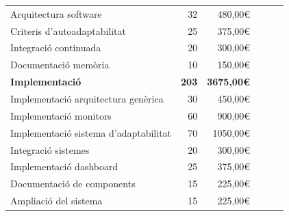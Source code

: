 \begin{table}[htb]
{\begin{tabular}{lrrrrr}
Arquitectura software                        & 32                                                                                      & 480,00\euro                                        \\
Criteris d'autoadaptabilitat                 & 25                                                                                       & 375,00\euro                                        \\
Integració continuada                        & 20                                                                                        & 300,00\euro                                       \\
Documentació memòria                         & 10                                                                                      & 150,00\euro                                        \\
\hline
\textbf{Implementació}                       & \textbf{203}                                                                  & \textbf{3675,00\euro}                              \\
\hline
Implementació arquitectura genèrica                       & 30                                                                                      & 450,00\euro                                        \\
Implementació monitors                       & 60                                                                                       & 900,00\euro                                        \\
Implementació sistema d'adaptabilitat                      & 70                                                                                      & 1050,00\euro                                        \\
Integració sistemes                      & 20                                                                                        & 300,00\euro                                        \\
Implementació dashboard                      & 25                                                                                   & 375,00\euro                                        \\
Documentació de components                   & 15                                                                                        & 225,00\euro                                        \\
Ampliació del sistema                        & 15                                                                                         & 225,00\euro                                        \\

\end{tabular}}
\end{table}
